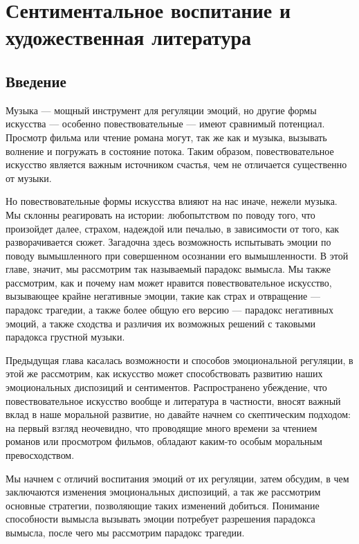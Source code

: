 \documentclass[11pt]{book}
\begin{document}
\chapter{Сентиментальное воспитание и художественная литература}

\section{Введение}

Музыка --- мощный инструмент для регуляции эмоций, но другие формы искусства --- особенно повествовательные --- имеют сравнимый потенциал. Просмотр фильма или чтение романа могут, так же как и музыка, вызывать волнение и погружать в состояние потока. Таким образом, повествовательное искусство является важным источником счастья, чем не отличается существенно от музыки.

Но повествовательные формы искусства влияют на нас иначе, нежели музыка. Мы склонны реагировать на истории: любопытством по поводу того, что произойдет далее, страхом, надеждой или печалью, в зависимости от того, как разворачивается сюжет. Загадочна здесь возможность испытывать эмоции по поводу вымышленного при совершенном осознании его вымышленности. В этой главе, значит, мы рассмотрим так называемый парадокс вымысла. Мы также рассмотрим, как и почему нам может нравится повествовательное искусство, вызывающее крайне негативные эмоции, такие как страх и отвращение --- парадокс трагедии, а также более общую его версию --- парадокс негативных эмоций, а также сходства и различия их возможных решений с таковыми парадокса грустной музыки.

Предыдущая глава касалась возможности и способов эмоциональной регуляции, в этой же рассмотрим, как искусство может способствовать развитию наших эмоциональных диспозиций и сентиментов. Распространено убеждение, что повествовательное искусство вообще и литература в частности, вносят важный вклад в наше моральной развитие, но давайте начнем со скептическим подходом: на первый взгляд неочевидно, что проводящие много времени за чтением романов или просмотром фильмов, обладают каким-то особым моральным превосходством.

Мы начнем с отличий воспитания эмоций от их регуляции, затем обсудим, в чем заключаются изменения эмоциональных диспозиций, а так же рассмотрим основные стратегии, позволяющие таких изменений добиться. Понимание способности вымысла вызывать эмоции потребует разрешения парадокса вымысла, после чего мы рассмотрим парадокс трагедии.
\end{document}
